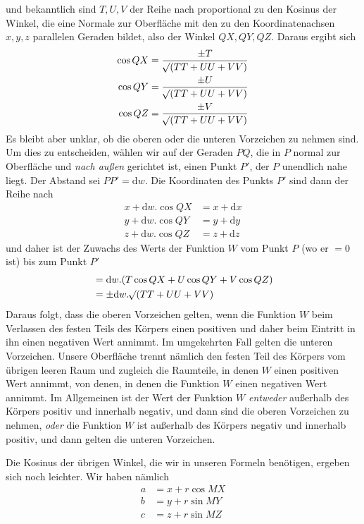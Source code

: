 und bekanntlich sind $T,U,V$ der Reihe nach proportional zu den Kosinus der Winkel, die eine Normale zur Oberfläche mit den zu den Koordinatenachsen $x,y,z$ parallelen Geraden bildet, also der Winkel $QX,QY,QZ$. Daraus ergibt sich
\[
\begin{aligned}
\cos QX&=\frac{\pm T}{\mathord{{}^{}\!\surd}(TT+UU+VV)}\\
\cos QY&=\frac{\pm U}{\mathord{{}^{}\!\surd}(TT+UU+VV)}\\
\cos QZ&=\frac{\pm V}{\mathord{{}^{}\!\surd}(TT+UU+VV)}
\end{aligned}
\]
Es bleibt aber unklar, ob die oberen oder die unteren Vorzeichen zu nehmen sind. Um dies zu entscheiden, wählen wir auf der Geraden $PQ$, die in $P$ normal zur Oberfläche und \textit{nach außen} gerichtet ist, einen Punkt $P'$, der $P$ unendlich nahe liegt. Der Abstand sei $PP'=\mathrm{d}w$. Die Koordinaten des Punkts $P'$ sind dann der Reihe nach
\[
\begin{aligned}
x+\mathrm{d}w.\cos QX&=x+\mathrm{d}x\\
y+\mathrm{d}w.\cos QY&=y+\mathrm{d}y\\
z+\mathrm{d}w.\cos QZ&=z+\mathrm{d}z
\end{aligned}
\]
und daher ist der Zuwachs des Werts der Funktion $W$ vom Punkt $P$ (wo er $=0$ ist) bis zum Punkt $P'$
\[
\begin{aligned}
&=\mathrm{d}w.(T\cos QX+U\cos QY+V\cos QZ)\\
&=\pm\mathrm{d}w.\mathord{{}^{}\!\surd}(TT+UU+VV)
\end{aligned}
\]
Daraus folgt, dass die oberen Vorzeichen gelten, wenn die Funktion $W$ beim Verlassen des festen Teils des Körpers einen positiven und daher beim Eintritt in ihn einen negativen Wert annimmt. Im umgekehrten Fall gelten die unteren Vorzeichen. Unsere Oberfläche trennt nämlich den festen Teil des Körpers vom übrigen leeren Raum und zugleich die Raumteile, in denen $W$ einen positiven Wert annimmt, von denen, in denen die Funktion $W$ einen negativen Wert annimmt. Im Allgemeinen ist der Wert der Funktion $W$ \textit{entweder} außerhalb des Körpers positiv und innerhalb negativ, und dann sind die oberen Vorzeichen zu nehmen, \textit{oder} die Funktion $W$ ist außerhalb des Körpers negativ und innerhalb positiv, und dann gelten die unteren Vorzeichen.

Die Kosinus der übrigen Winkel, die wir in unseren Formeln benötigen, ergeben sich noch leichter. Wir haben nämlich
\[
\begin{aligned}
a&=x+r\cos MX\\
b&=y+r\sin MY\\
c&=z+r\sin MZ
\end{aligned}
\]
